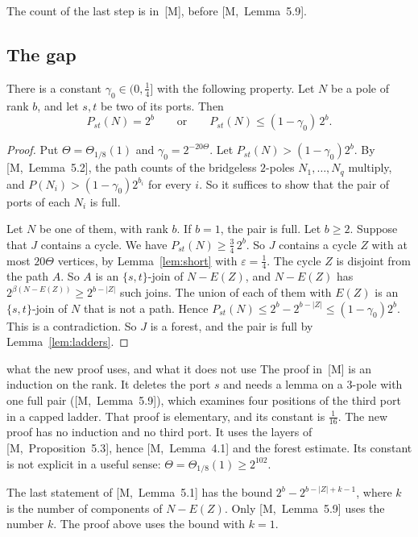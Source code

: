 \documentclass[11pt]{article}
\newcommand{\M}[1]{[M,~#1]}
\begin{document}
The count of the last step is in~[M], before \M{Lemma~5.9}.

\subsection{The gap}

\begin{theorem}[Gap]\label{thm:gap}
There is a constant $\gamma_0\in(0,\frac14]$ with the following property. Let $N$ be a pole of
rank $b$, and let $s,t$ be two of its ports. Then
\[
  P_{st}(N)=2^{b}\qquad\text{or}\qquad P_{st}(N)\le(1-\gamma_0)\,2^{b}.
\]
\end{theorem}

\begin{proof}
Put $\Theta=\Theta_{1/8}(1)$ and $\gamma_0=2^{-20\Theta}$. Let $P_{st}(N)>(1-\gamma_0)2^{b}$. By
\M{Lemma~5.2}, the path counts of the bridgeless $2$-poles $N_1,\dots,N_q$ multiply, and
$P(N_i)>(1-\gamma_0)2^{b_i}$ for every $i$. So it suffices to show that the pair of ports of each
$N_i$ is full.

Let $N$ be one of them, with rank $b$. If $b=1$, the pair is full. Let $b\ge2$. Suppose that $J$
contains a cycle. We have $P_{st}(N)\ge\frac34\,2^{b}$. So $J$ contains a cycle $Z$ with at most
$20\Theta$ vertices, by Lemma~\ref{lem:short} with $\varepsilon=\frac14$. The cycle $Z$ is
disjoint from the path $A$. So $A$ is an $\{s,t\}$-join of $N-E(Z)$, and $N-E(Z)$ has
$2^{\beta(N-E(Z))}\ge2^{b-|Z|}$ such joins. The union of each of them with $E(Z)$ is an
$\{s,t\}$-join of $N$ that is not a path. Hence $P_{st}(N)\le2^{b}-2^{b-|Z|}\le(1-\gamma_0)2^{b}$.
This is a contradiction. So $J$ is a forest, and the pair is full by Lemma~\ref{lem:ladders}.
\end{proof}

\begin{idea}{what the new proof uses, and what it does not use}
The proof in~[M] is an induction on the rank. It deletes the port $s$ and needs a lemma on a
$3$-pole with one full pair (\M{Lemma~5.9}), which examines four positions of the third port in
a capped ladder. That proof is elementary, and its constant is $\frac1{16}$. The new proof has no
induction and no third port. It uses the layers of \M{Proposition~5.3}, hence \M{Lemma~4.1} and
the forest estimate. Its constant is not explicit in a useful sense:
$\Theta=\Theta_{1/8}(1)\ge2^{102}$.
\end{idea}

The last statement of \M{Lemma~5.1} has the bound $2^{b}-2^{b-|Z|+k-1}$, where $k$ is the number
of components of $N-E(Z)$. Only \M{Lemma~5.9} uses the number $k$. The proof above uses the bound
with $k=1$.
\end{document}
